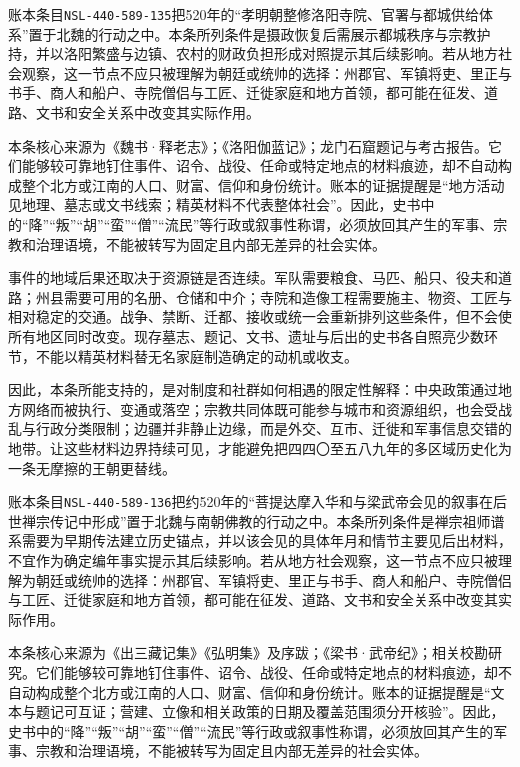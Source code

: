 账本条目\texttt{NSL-440-589-135}把520年的“孝明朝整修洛阳寺院、官署与都城供给体系”置于北魏的行动之中。本条所列条件是摄政恢复后需展示都城秩序与宗教护持，并以洛阳繁盛与边镇、农村的财政负担形成对照提示其后续影响。若从地方社会观察，这一节点不应只被理解为朝廷或统帅的选择：州郡官、军镇将吏、里正与书手、商人和船户、寺院僧侣与工匠、迁徙家庭和地方首领，都可能在征发、道路、文书和安全关系中改变其实际作用。

本条核心来源为《魏书·释老志》；《洛阳伽蓝记》；龙门石窟题记与考古报告。它们能够较可靠地钉住事件、诏令、战役、任命或特定地点的材料痕迹，却不自动构成整个北方或江南的人口、财富、信仰和身份统计。账本的证据提醒是“地方活动见地理、墓志或文书线索；精英材料不代表整体社会”。因此，史书中的“降”“叛”“胡”“蛮”“僧”“流民”等行政或叙事性称谓，必须放回其产生的军事、宗教和治理语境，不能被转写为固定且内部无差异的社会实体。

事件的地域后果还取决于资源链是否连续。军队需要粮食、马匹、船只、役夫和道路；州县需要可用的名册、仓储和中介；寺院和造像工程需要施主、物资、工匠与相对稳定的交通。战争、禁断、迁都、接收或统一会重新排列这些条件，但不会使所有地区同时改变。现存墓志、题记、文书、遗址与后出的史书各自照亮少数环节，不能以精英材料替无名家庭制造确定的动机或收支。

因此，本条所能支持的，是对制度和社群如何相遇的限定性解释：中央政策通过地方网络而被执行、变通或落空；宗教共同体既可能参与城市和资源组织，也会受战乱与行政分类限制；边疆并非静止边缘，而是外交、互市、迁徙和军事信息交错的地带。让这些材料边界持续可见，才能避免把四四〇至五八九年的多区域历史化为一条无摩擦的王朝更替线。

账本条目\texttt{NSL-440-589-136}把约520年的“菩提达摩入华和与梁武帝会见的叙事在后世禅宗传记中形成”置于北魏与南朝佛教的行动之中。本条所列条件是禅宗祖师谱系需要为早期传法建立历史锚点，并以该会见的具体年月和情节主要见后出材料，不宜作为确定编年事实提示其后续影响。若从地方社会观察，这一节点不应只被理解为朝廷或统帅的选择：州郡官、军镇将吏、里正与书手、商人和船户、寺院僧侣与工匠、迁徙家庭和地方首领，都可能在征发、道路、文书和安全关系中改变其实际作用。

本条核心来源为《出三藏记集》《弘明集》及序跋；《梁书·武帝纪》；相关校勘研究。它们能够较可靠地钉住事件、诏令、战役、任命或特定地点的材料痕迹，却不自动构成整个北方或江南的人口、财富、信仰和身份统计。账本的证据提醒是“文本与题记可互证；营建、立像和相关政策的日期及覆盖范围须分开核验”。因此，史书中的“降”“叛”“胡”“蛮”“僧”“流民”等行政或叙事性称谓，必须放回其产生的军事、宗教和治理语境，不能被转写为固定且内部无差异的社会实体。

